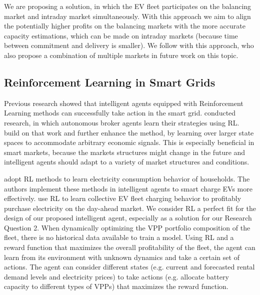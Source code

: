 \documentclass[12pt, article]{article}
\begin{document}
We are proposing a solution, in which the EV fleet participates on the balancing
market and intraday market simultaneously. With this approach we aim to align
the potentially higher profits on the balancing markets with the more accurate
capacity estimations, which can be made on intraday markets (because time
between commitment and delivery is smaller). We follow
\textcite{kahlen15_aggreg_elect_cars_sustain_virtual_power_plant} with this
approach, who also propose a combination of multiple markets in future work on
this topic.

\subsection{Reinforcement Learning in Smart Grids}
\label{sec:orgf875efc}

Previous research showed that intelligent agents equipped with Reinforcement
Learning methods can successfully take action in the smart grid.
\textcite{reddy11_strat,reddy11_learn_behav_multip_auton_agent} conducted
research, in which autonomous broker agents \parencite{ketter13_power_tac} learn
their strategies using RL. \textcite{peters13_reinf_learn_approac_to_auton} build
on that work and further enhance the method, by learning over larger state
spaces to accommodate arbitrary economic signals. This is especially beneficial
in smart markets, because the markets structures might change in the future and
intelligent agents should adapt to a variety of market structures and
conditions.

\parencite{vazquez-canteli19_reinf_learn_deman_respon}


\textcite{valogianni14_effec_manag_elect_vehic_storag} adopt RL methods to learn
electricity consumption behavior of households. The authors implement these
methods in intelligent agents to smart charge EVs more effectively.
\textcite{vandael15_reinf_learn_heuris_ev_fleet} use RL to learn collective EV
fleet charging behavior to profitably purchase electricity on the day-ahead
market. We consider RL a perfect fit for the design of our proposed intelligent
agent, especially as a solution for our Research Question 2. When dynamically
optimizing the VPP portfolio composition of the fleet, there is no historical
data available to train a model. Using RL and a reward function that maximizes
the overall profitability of the fleet, the agent can learn from its environment
with unknown dynamics and take a certain set of actions. The agent can consider
different states (e.g. current and forecasted rental demand levels and
electricity prices) to take actions (e.g. allocate battery capacity to different
types of VPPs) that maximizes the reward function.
\end{document}

